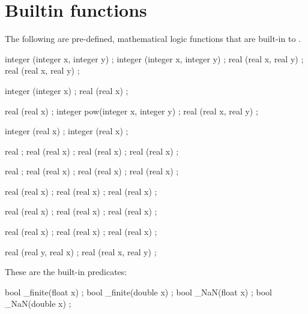 \section{Builtin functions}
\label{sec:builtinns}

The following are pre-defined, mathematical logic functions that are built-in
to \NAME.

\begin{listing-nonumber}
integer \min(integer x, integer y) ;
integer \max(integer x, integer y) ;
real \min(real x, real y) ;
real \max(real x, real y) ;

integer \abs(integer x) ;
real \abs(real x) ;

real \sqrt(real x) ;
integer pow(integer x, integer y) ;
real \pow(real x, real y) ;

integer \ceil(real x) ;
integer \floor(real x) ;

real \e ;
real \exp(real x) ;
real \log(real x) ;
real (real x) ;

real \pi ;
real \sin(real x) ;
real \cos(real x) ;
real \tan(real x) ;

real \cosh(real x) ;
real \sinh(real x) ;
real \tanh(real x) ;

real \asin(real x) ;
real \acos(real x) ;
real \atan(real x) ;

real \asinh(real x) ;
real \acosh(real x) ;
real \atanh(real x) ;

real (real y, real x) ;
real \hypot(real x, real y) ;
\end{listing-nonumber}

These are the built-in predicates:
\begin{listing-nonumber}
bool \is_finite(float x) ;
bool \is_finite(double x) ;
bool \is_NaN(float x) ;
bool \is_NaN(double x) ;

\end{listing-nonumber}

